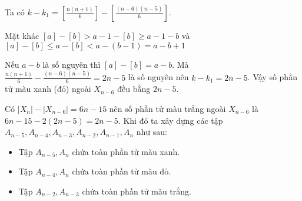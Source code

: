\begin{bt}
{		Ta có $k-k_1=\left[\frac{n(n+1)}{6}\right]-\left[\frac{(n-6)(n-5)}{6}\right]$. 
		
		Mặt khác $[a]-[b]> a-1-[b]\geq a-1-b$ và $[a]-[b]\leq a-[b]< a-(b-1)=a-b+1$
		
		Nếu $a-b$ là số nguyên thì $[a]- [b] =a-b$. Mà $\frac{n(n+1)}{6}-\frac{(n-6)(n-5)}{6}=2n-5$ là số nguyên nên $k-k_1 =2n-5$. Vậy số phần tử màu xanh (đỏ) ngoài $X_{n-6}$ đều bằng $2n-5$.
		
		Có $|X_n|-|X_{n-6}|=6n-15$ nên số phần tử màu trắng ngoài $X_{n-6}$ là $6n-15-2(2n-5)=2n-5$. Khi đó ta xây dựng các tập $A_{n-5},A_{n-4},A_{n-3},A_{n-2},A_{n-1},A_n$ như sau:
		\begin{itemize}
			\item Tập $A_{n-5},A_n$ chứa toàn phần tử màu xanh.
			\item Tập $A_{n-4},A_n$ chứa toàn phần tử màu đỏ.
			\item Tập $A_{n-2},A_{n-3}$ chứa toàn phần tử màu trắng.
	\end{itemize}}
\end{bt}

